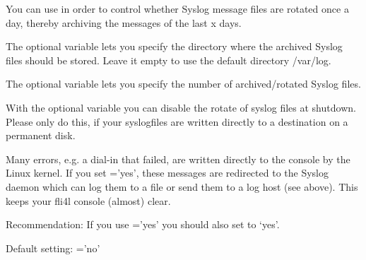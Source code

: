 \begin{description}

  You can use  in order to control whether Syslog message
  files are rotated once a day, thereby archiving the messages of the last x
  days.


  The optional variable  lets you specify the
  directory where the archived Syslog files should be stored. Leave it empty
  to use the default directory /var/log.


  The optional variable  lets you specify the number of
  archived/rotated Syslog files.


  With the optional variable  you can disable the rotate
  of syslog files at shutdown. Please only do this, if your syslogfiles are written directly to
  a destination on a permanent disk.

\end{description}



  Many errors, e.g. a dial-in that failed, are written directly to the console
  by the Linux kernel. If you set ='yes', these messages are
  redirected to the Syslog daemon which can log them to a file or send them to
  a log host (see above). This keeps your fli4l console (almost) clear.

  \noindent Recommendation: If you use ='yes' you should
  also set  to `yes'.

  Default setting: ='no'



